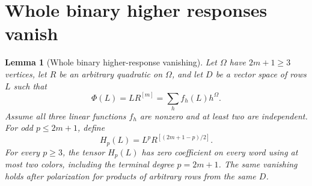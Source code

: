 \documentclass[11pt]{article}
\newtheorem{lemma}[theorem]{Lemma}
\numberwithin{equation}{section}
\begin{document}
\section{Whole binary higher responses vanish}\label{sec:higher}

\begin{lemma}[Whole binary higher-response vanishing]\label{lem:higher}
Let \(\Omega\) have \(2m+1\ge3\) vertices, let \(R\) be an arbitrary quadratic
on \(\Omega\), and let \(D\) be a vector space of rows \(L\) such that
\begin{equation}
 \Phi(L)=L R^{[m]}=\sum_h f_h(L)h^\Omega.
 \tag{2}\label{eq:root}
\end{equation}
Assume all three linear functions \(f_h\) are nonzero and at least two are
independent. For odd \(p\le2m+1\), define
\[
 H_p(L)=L^p R^{[(2m+1-p)/2]}.
\]
For every \(p\ge3\), the tensor \(H_p(L)\) has zero coefficient on every word
using at most two colors, including the terminal degree \(p=2m+1\).
The same vanishing holds after polarization for products of arbitrary rows
from the same \(D\).
\end{lemma}
\end{document}
